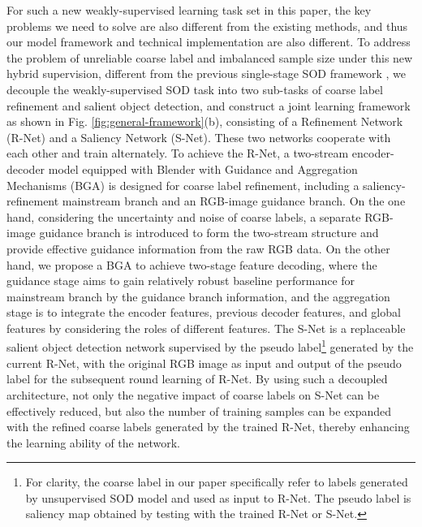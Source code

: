 \documentclass[journal]{IEEEtran}
\begin{document}
For such a new weakly-supervised learning task set in this paper, the key problems we need to solve are also different from the existing methods, and thus our model framework and technical implementation are also different.
To address the problem of unreliable coarse label and imbalanced sample size under this new hybrid supervision, different from the previous single-stage SOD framework \cite{wang2017learning,zhang2018deep,DBLP:journals/tcsv/ZhengTZML21}, we decouple the weakly-supervised SOD task into two sub-tasks of coarse label refinement and salient object detection, and construct a joint learning framework as shown in Fig. \ref{fig:general-framework}(b), consisting of a Refinement Network (R-Net) and a Saliency Network (S-Net). These two networks cooperate with each other and train alternately.
To achieve the R-Net, a two-stream encoder-decoder model equipped with Blender with Guidance and Aggregation Mechanisms (BGA) is designed for coarse label refinement, including a saliency-refinement mainstream branch and an RGB-image guidance branch. On the one hand, considering the uncertainty and noise of coarse labels, a separate RGB-image guidance branch is introduced to form the two-stream structure and provide effective guidance information from the raw RGB data. On the other hand, we propose a BGA to achieve two-stage feature decoding, where the guidance stage aims to gain relatively robust baseline performance for mainstream branch by the guidance branch information, and the aggregation stage is to integrate the encoder features, previous decoder features, and global features by considering the roles of different features.
The S-Net is a replaceable salient object detection network supervised by the pseudo label\footnote{For clarity, the coarse label in our paper specifically refer to labels generated by unsupervised SOD model and used as input to R-Net. The pseudo label is saliency map obtained by testing with the trained R-Net or S-Net.} generated by the current R-Net, with the original RGB image as input and output of the pseudo label for the subsequent round learning of R-Net.
By using such a decoupled architecture, not only the negative impact of coarse labels on S-Net can be effectively reduced, but also the number of training samples can be expanded with the refined coarse labels generated by the trained R-Net, thereby enhancing the learning ability of the network.
\end{document}
